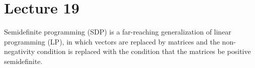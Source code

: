 %
%
% 


\chapter*{Lecture 19}
\setcounter{chapter}{19}
\setcounter{section}{0}
\setcounter{equation}{0}
\setcounter{theorem}{0}


Semidefinite programming (SDP) is a far-reaching generalization of linear programming (LP), in which vectors are replaced by matrices and the non-negativity condition is replaced with the condition that the matrices be positive semidefinite. 

